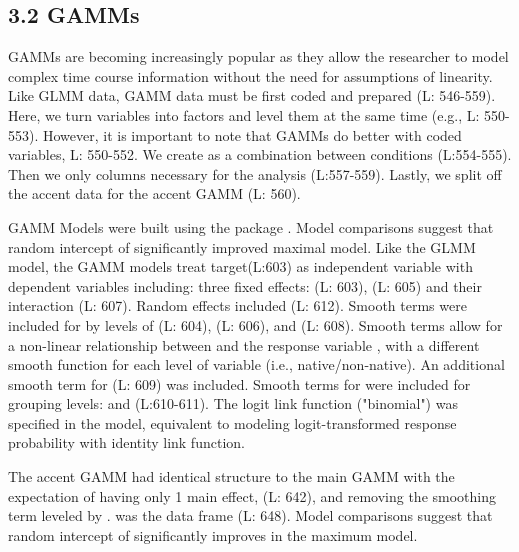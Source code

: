 

\subsection{3.2 GAMMs}
GAMMs are becoming increasingly popular as they allow the researcher to model complex time course information without the need for assumptions of linearity. Like GLMM data, GAMM data must be first coded and prepared (L: 546-559). Here, we turn variables into factors and level them at the same time (e.g., L: 550-553). However, it is important to note that GAMMs do better with coded variables, L: 550-552. We create  as a combination between conditions (L:554-555). Then we only  columns necessary for the analysis (L:557-559). Lastly, we split off the accent data for the accent GAMM (L: 560).



GAMM Models were built using the  package \parencite{mgcv_wood_2017}. Model comparisons suggest that random intercept of  significantly improved maximal model. Like the GLMM model, the GAMM models treat target(L:603) as independent variable with dependent variables including: three fixed effects:  (L: 603),  (L: 605) and their interaction (L: 607). Random effects included  (L: 612). Smooth terms were included for  by levels of  (L: 604),  (L: 606), and  (L: 608). Smooth terms allow for a non-linear relationship between  and the response variable , with a different smooth function for each level of variable (i.e., native/non-native). An additional smooth term for  (L: 609) was included. Smooth terms for  were included for grouping levels:  and  (L:610-611). The logit link function ("binomial") was specified in the model, equivalent to modeling logit-transformed response probability with identity link function. 



The accent GAMM had identical structure to the main GAMM with the expectation of having only 1 main effect,  (L: 642), and removing the smoothing term leveled by .  was the data frame (L: 648). Model comparisons suggest that random intercept of  significantly improves in the maximum model.

